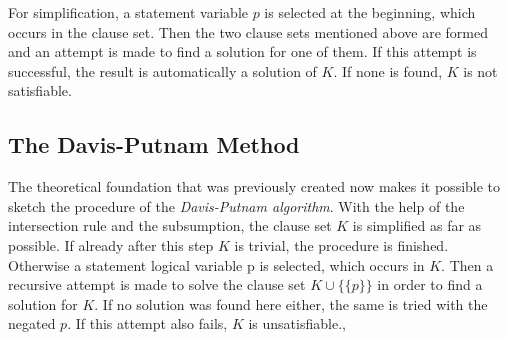 For simplification, a statement variable $p$ is selected at the beginning, which occurs in the clause set. Then the two clause sets mentioned above are formed and an attempt is made to find a solution for one of them. If this attempt is successful, the result is automatically a solution of $K$. If none is found, $K$ is not satisfiable.

\subsection{The Davis-Putnam Method}
\label{sub:sciDavisPutnamMethod}
The theoretical foundation that was previously created now makes it possible to sketch the procedure of the \textit{Davis-Putnam algorithm}. With the help of the intersection rule and the subsumption, the clause set $K$ is simplified as far as possible. If already after this step $K$ is trivial, the procedure is finished. Otherwise a statement logical variable p is selected, which occurs in $K$. Then a recursive attempt is made to solve the clause set $K \cup \bigl\{\{p\}\bigr\}$ in order to find a solution for $K$. If no solution was found here either, the same is tried with the negated $p$. If this attempt also fails, $K$ is unsatisfiable.\cite{Zhang2000}, \cite{Stroetman2019}


